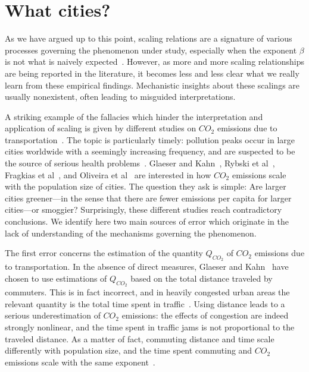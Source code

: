 \section{What cities?}
\label{sec:what_cities_}

As we have argued up to this point, scaling relations are a signature
of various processes governing the phenomenon under study, especially when the exponent
$\beta$ is not what is naively expected~\cite{Barenblatt:2003}. However, as more and more scaling
relationships are being reported in the literature, it becomes less and less clear what we really
learn from these empirical findings. Mechanistic insights about these scalings are usually
nonexistent, often leading to misguided interpretations.


A striking example of the fallacies which hinder the interpretation and application
of scaling is given by different studies on $CO_2$ emissions due to transportation~\cite{Fragkias:2013,Glaeser:2010,Oliveira:2014,Rybski:2013}. The topic
is particularly timely: pollution peaks occur in large cities worldwide with a seemingly
increasing frequency, and are suspected to be the source of serious health problems~\cite{Bernstein:2004}. Glaeser and Kahn~\cite{Glaeser:2010}, Rybski et al~\cite{Rybski:2013}, Fragkias et al~\cite{Fragkias:2013}, and Oliveira et al~\cite{Oliveira:2014} are interested in how $CO_2$ emissions scale with the population size
of cities. The question they ask is simple: Are larger cities greener---in the sense that there
are fewer emissions per capita for larger cities---or smoggier? Surprisingly, these different
studies reach contradictory conclusions. We identify here two main sources of error which
originate in the lack of understanding of the mechanisms governing the phenomenon.

The first error concerns the estimation of the quantity $Q_{CO_2}$ of $CO_2$ emissions due to
transportation. In the absence of direct measures, Glaeser and Kahn~\cite{Glaeser:2010} have chosen
to use estimations of $Q_{CO_2}$ based on the total distance traveled by commuters. This is in fact
incorrect, and in heavily congested urban areas the relevant quantity is the total time spent
in traffic~\cite{Louf:2013}. Using distance leads to a serious underestimation of
$CO_2$ emissions: the effects of congestion are indeed strongly nonlinear, and the time spent
in traffic jams is not proportional to the traveled distance. As a matter of fact, commuting
distance and time scale differently with population size, and the time spent commuting and
$CO_2$ emissions scale with the same exponent~\cite{Louf:2014}.

